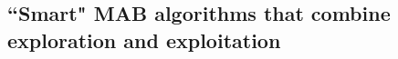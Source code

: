 \subsection{``Smart" MAB algorithms that combine exploration and exploitation}
\label{sec:MAB-smart}


%





